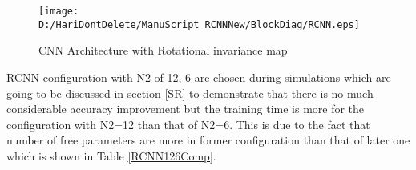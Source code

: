\begin{figure*}
\centering
\texttt{[image: D:/HariDontDelete/ManuScript\_RCNNNew/BlockDiag/RCNN.eps]}
\caption{CNN Architecture with Rotational invariance map}
\label{FIG:RCNN}
\end{figure*}

\begin{table*}
\caption{Details of mapping between layers : RCNN Configuration}
\smallskip\noindent
{}
\end{table*}

RCNN configuration with N2 of 12, 6 are chosen during simulations which are going to be discussed in section \ref{SR} to demonstrate that there is no much considerable accuracy improvement but the training time is more for the configuration with N2=12 than that of N2=6. This is due to the fact that number of free parameters are more in former configuration than that of later one which is shown in Table \ref{RCNN126Comp}. \\

